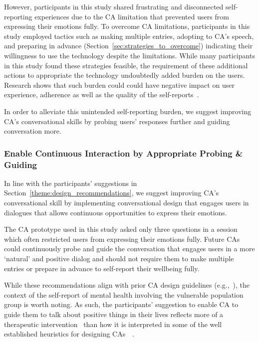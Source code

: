         However, participants in this study shared frustrating and disconnected self-reporting experiences due to the
        \ac{CA} limitation that prevented users from expressing their emotions fully. To overcome \ac{CA} limitations, participants in this study employed tactics such as making multiple entries, adopting to \ac{CA}'s speech, and preparing in advance (Section~\ref{sec:strategies_to_overcome}) indicating their willingness to use the technology despite the limitations. While many participants in this study found these strategies feasible, the requirement of these additional actions to appropriate the technology undoubtedly added burden on the users. Research shows that such burden could could have negative impact on user experience, adherence as well as the quality of the self-reports~\cite{doherty2020design}.
        
        In order to alleviate this unintended self-reporting burden, we suggest improving \ac{CA}'s conversational skills by probing users' responses further and guiding conversation more.

        \subsubsection{Enable Continuous Interaction by Appropriate Probing \& Guiding}
        
            In line with the participants' suggestions in Section~\ref{theme:design_recommendations}, we suggest improving \ac{CA}'s conversational skill by implementing conversational design that engages users in dialogues that allows continuous opportunities to express their emotions. 
            
            The \ac{CA} prototype used in this study asked only three questions in a session which often restricted users from expressing their emotions fully. Future \ac{CA}s could continuously probe and guide the conversation that engages users in a more `natural' and positive dialog and should not require them to make multiple entries or prepare in advance to self-report their wellbeing fully.
            
            While these recommendations align with prior \ac{CA} design guidelines (e.g.,~\cite{murad2019revolution, langevin2021heuristic}), the context of the self-report of mental health involving the vulnerable population group is worth noting. As such, the participants' suggestion to enable \ac{CA} to guide them to talk about positive things in their lives reflects more of a therapeutic intervention~\cite{tindall2017behavioural} than how it is interpreted in some of the well established heuristics for designing \ac{CA}s~\cite[Table 2. G10]{murad2019revolution}~\cite[Table 8]{langevin2021heuristic}. 
            


